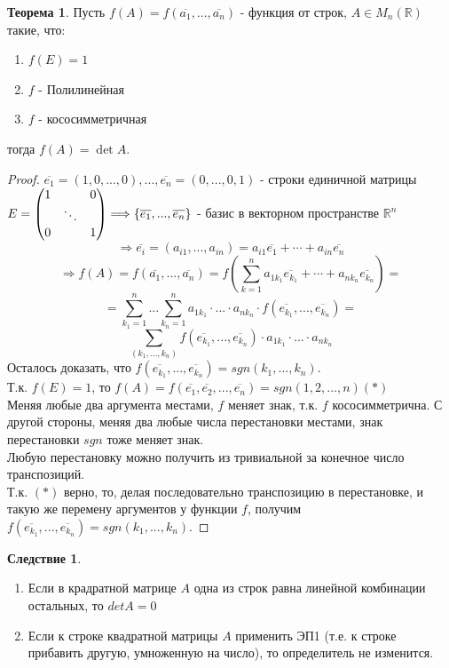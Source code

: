 \documentclass[a4paper, 12pt]{article}
\newcommand{\R}{\mathbb R}
\newcommand\tab[1][.5cm]{\hspace*{#1}}
\theoremstyle{definition}
\newtheorem*{theorem}{Теорема}
\newtheorem*{consequense}{Следствие}
\begin{document}
  \begin{theorem}
    Пусть $f(A)=f(\overline{a_1},\dots,\overline{a_n})$ - функция от строк, $A\in M_n(\R)$ такие, что:
    \begin{enumerate}
      \item $f(E)=1$
      \item $f$ - Полилинейная
      \item $f$ - кососимметричная
    \end{enumerate}
      тогда $f(A)=\det{A}$.
  \end{theorem}
  \begin{proof}
    $\overline{e_1} = (1,0,...,0),...,\overline{e_n}=(0,...,0,1)$ - строки единичной матрицы $E = \begin{pmatrix}
      1 & \null & 0\\
      \null & \ddots & \null \\
      0 & \null & 1
    \end{pmatrix} \Longrightarrow  \{\overline{e_1},...,\overline{e_n}\}$ - базис в векторном пространстве $\R^n$ 
    $$\Longrightarrow \overline{e_i} = (a_{i1},...,a_{in}) = a_{i1}\overline{e_1} + \cdots + a_{in}\overline{e_n}$$
    $$\Longrightarrow f(A) = f(\overline{a_1},...,\overline{a_n}) = f(\sum \limits_{k=1}^na_{1k_1}\overline{e_{k_1}}+ \cdots + a_{nk_n}\overline{e_{k_n}}) = $$
    $$= \sum \limits_{k_1=1}^n ... \sum \limits_{k_n=1}^n a_{1k_1}\cdot ... \cdot a_{nk_n}\cdot f(\overline{e_{k_1}},...,\overline{e_{k_n}}) =$$
    $$\sum \limits_{(k_1,...,k_n)}f(\overline{e_{k_1}},...,\overline{e_{k_n}})\cdot a_{1k_1}\cdot ... \cdot a_{nk_n}$$ 
    Осталось доказать, что $f(\overline{e_{k_1}},...,\overline{e_{k_n}}) = sgn(k_1,...,k_n)$. \\
    Т.к. $f(E) =1$, то $f(A) = f(\overline{e_1},\overline{e_2},...,\overline{e_n}) = sgn(1,2,...,n) (*)$   \\
    Меняя любые два аргумента местами, $f$ меняет знак, т.к. $f$ кососимметрична. С другой стороны, меняя два любые числа перестановки местами, знак перестановки $sgn$ тоже меняет знак. \\
    Любую перестановку можно получить из тривиальной за конечное число транспозиций. \\
    Т.к. $(*)$ верно, то, делая последовательно транспозицию в перестановке, и такую же перемену аргументов у функции $f$, получим $f(\overline{e_{k_1}},...,\overline{e_{k_n}}) = sgn(k_1,...,k_n)$. 
  \end{proof} 
  \begin{consequense} \tab
    \begin{enumerate}
      \item Если в крадратной матрице $A$ одна из строк равна линейной комбинации остальных, то $detA = 0$
      \item Если к строке квадратной матрицы $A$ применить ЭП1 (т.е. к строке прибавить другую, умноженную на число), то определитель не изменится. 
    \end{enumerate}
  \end{consequense} 
\end{document}
